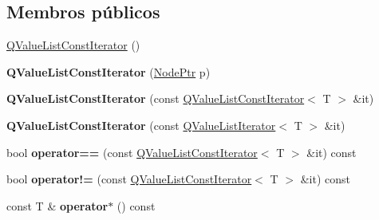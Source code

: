 \subsection*{Membros públicos}
\begin{DoxyCompactItemize}
\item 
\hyperlink{class_q_value_list_const_iterator_a910ab7b750b0ec61d1cf2170c1487224}{Q\-Value\-List\-Const\-Iterator} ()
\item 
\hypertarget{class_q_value_list_const_iterator_a9f33d87d125a497bfd3b5910ab569f1f}{{\bfseries Q\-Value\-List\-Const\-Iterator} (\hyperlink{class_q_value_list_const_iterator_a33149bd41c7bb5c96791c9455305e769}{Node\-Ptr} p)}\label{class_q_value_list_const_iterator_a9f33d87d125a497bfd3b5910ab569f1f}

\item 
\hypertarget{class_q_value_list_const_iterator_ae935232988b4f9a030a7bbad65847d3e}{{\bfseries Q\-Value\-List\-Const\-Iterator} (const \hyperlink{class_q_value_list_const_iterator}{Q\-Value\-List\-Const\-Iterator}$<$ T $>$ \&it)}\label{class_q_value_list_const_iterator_ae935232988b4f9a030a7bbad65847d3e}

\item 
\hypertarget{class_q_value_list_const_iterator_a0d9210afb3dddd52f20a739c37962b63}{{\bfseries Q\-Value\-List\-Const\-Iterator} (const \hyperlink{class_q_value_list_iterator}{Q\-Value\-List\-Iterator}$<$ T $>$ \&it)}\label{class_q_value_list_const_iterator_a0d9210afb3dddd52f20a739c37962b63}

\item 
\hypertarget{class_q_value_list_const_iterator_ab6a9dcbf82a84b6609dd91ceb1b54f7b}{bool {\bfseries operator==} (const \hyperlink{class_q_value_list_const_iterator}{Q\-Value\-List\-Const\-Iterator}$<$ T $>$ \&it) const }\label{class_q_value_list_const_iterator_ab6a9dcbf82a84b6609dd91ceb1b54f7b}

\item 
\hypertarget{class_q_value_list_const_iterator_a3d61f4843b32eaa21d37d7c7292b527a}{bool {\bfseries operator!=} (const \hyperlink{class_q_value_list_const_iterator}{Q\-Value\-List\-Const\-Iterator}$<$ T $>$ \&it) const }\label{class_q_value_list_const_iterator_a3d61f4843b32eaa21d37d7c7292b527a}

\item 
\hypertarget{class_q_value_list_const_iterator_a0ad02595c2fdf7a496eda1d646060eab}{const T \& {\bfseries operator$\ast$} () const }\label{class_q_value_list_const_iterator_a0ad02595c2fdf7a496eda1d646060eab}


\end{DoxyCompactItemize}
